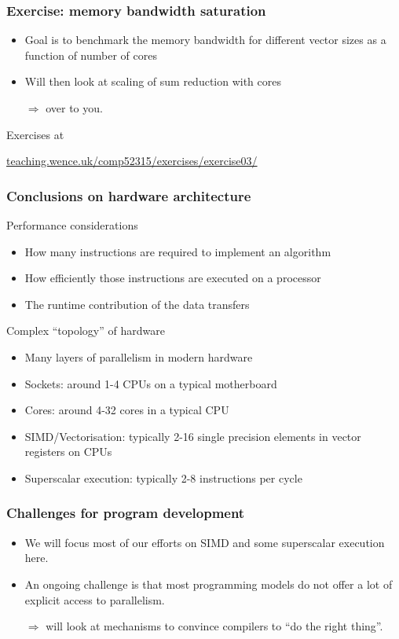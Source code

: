 \documentclass[dvipsnames,presentation,aspectratio=169,14pt]{beamer}
\begin{document}
\begin{frame}
  \frametitle{Exercise: memory bandwidth saturation}
  \begin{itemize}
  \item Goal is to benchmark the memory bandwidth for different vector
    sizes as a function of number of cores
  \item Will then look at scaling of sum reduction with cores
  \item[$\Rightarrow$] over to you.
  \end{itemize}
  \begin{center}
    Exercises at

    \url{teaching.wence.uk/comp52315/exercises/exercise03/}
  \end{center}
\end{frame}

\begin{frame}
  \frametitle{Conclusions on hardware architecture}
  \begin{challenge}{Performance considerations}
    \begin{itemize}
    \item How many instructions are required to implement an algorithm
    \item How efficiently those instructions are executed on a
      processor
    \item The runtime contribution of the data transfers
    \end{itemize}
  \end{challenge}
  \begin{answer}{Complex ``topology'' of hardware}
    \begin{itemize}
    \item Many layers of parallelism in modern hardware
    \item Sockets: around 1-4 CPUs on a typical motherboard
    \item Cores: around 4-32 cores in a typical CPU
    \item SIMD/Vectorisation: typically 2-16 single precision elements
      in vector registers on CPUs
    \item Superscalar execution: typically 2-8 instructions per cycle
    \end{itemize}
  \end{answer}
\end{frame}
\begin{frame}
  \frametitle{Challenges for program development}
  \begin{itemize}
  \item We will focus most of our efforts on SIMD and some superscalar
    execution here.
  \item An ongoing challenge is that most programming models do not
    offer a lot of explicit access to parallelism.
  \item[$\Rightarrow$] will look at mechanisms to convince compilers
    to ``do the right thing''.
  \end{itemize}
\end{frame}
\end{document}
